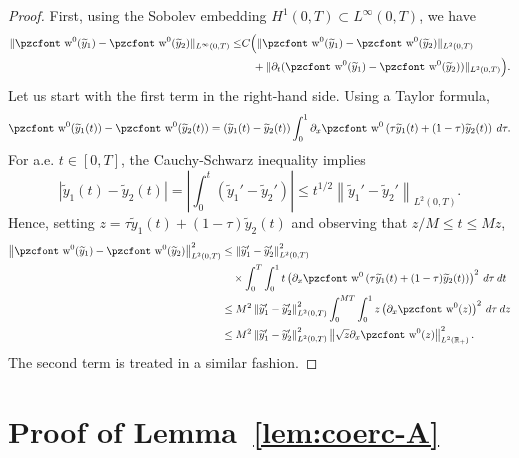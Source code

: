 \documentclass[10pt]{amsart}
\theoremstyle{definition}\newtheorem{defi}[theo]{Definition}\newtheorem{rema}[theo]{Remark}\newtheorem{exam}[theo]{Example}\newtheorem{exem}[theo]{Example}\newtheorem{nota}[theo]{Notation}
\newcommand{\mathpzc}[1]{\text{\pzcfont #1}}
\newcommand{\R}{\mathbb{R}}
\newcommand{\p}{\partial}
\newcommand{\tw}{\mathpzc{w}}
\newcommand{\ty}{\widetilde{y}}
\begin{document}
\begin{proof}
First, using the Sobolev embedding $H^1(0,T)\subset L^\infty(0,T)$, we have
\begin{align*}
\|\tw^0 (\ty_1)- \tw^0(\ty_2)\|_{L^\infty(0,T)} \leq &C \Big(\|\tw^0 (\ty_1)- \tw^0(\ty_2)\|_{L^2(0,T)} \\&\quad+ \|\p_t (\tw^0 (\ty_1)- \tw^0(\ty_2))\|_{L^2(0,T)}\Big).
\end{align*}
Let us start with the first term in the right-hand side. Using a Taylor formula,
\[
\tw^0 (\ty_1(t))- \tw^0(\ty_2(t))=(\ty_1(t)-\ty_2(t))\int_0^1 \p_x \tw^0\left(\tau \ty_1(t) + (1-\tau) \ty_2(t)\right)\:d\tau.
\]
For a.e. $t\in [0,T]$, the Cauchy-Schwarz inequality implies
\[
\left|\ty_1(t)-\ty_2(t)\right|=\left| \int_0^t \left(\ty_1'-\ty_2'\right)\right|\leq t^{1/2}\left\|\ty_1'-\ty_2'\right\|_{L^2(0,T)}.
\]
Hence, setting $z=\tau \ty_1(t) + (1-\tau) \ty_2(t)$ and observing that $z/M\leq t\leq Mz$,
\begin{align*}
\left\|\tw^0 (\ty_1)- \tw^0(\ty_2)\right\|_{L^2(0,T)}^2&\leq \left\|\ty_1'-\ty_2'\right\|_{L^2(0,T)}^2 \\
&\quad\times \int_0^T\int_0^1 t \left(\p_x \tw^0\left(\tau \ty_1(t) + (1-\tau) \ty_2(t)\right)\right)^2\:d\tau\:dt\\
&\leq M^2 \left\|\ty_1'-\ty_2'\right\|_{L^2(0,T)}^2 \int_0^{MT}\int_0^1 z \left(\p_x \tw^0(z)\right)^2 \:d\tau\:dz\\
&\leq M^2\left\|\ty_1'-\ty_2'\right\|_{L^2(0,T)}^2\left\| \sqrt{z} \p_x \tw^0(z)\right\|_{L^2(\R_+)}^2.
\end{align*}
The second term is treated in a similar fashion.
\end{proof}

\section{Proof of Lemma~\ref{lem:coerc-A}}\label{app:lem:coerc-A}
\end{document}
